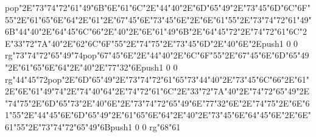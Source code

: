 pop{}\ipa\char"2E\ipa\char"73\ipa\char"74\ipa\char"72\ipa\char"61\ipa\char"49\ipa\char"6B\medskip\ipa\char"6E\ipa\char"61\ipa\char"6C\ipa\char"2E\ipa\char"44\ipa\char"40\ipa\char"2E\ipa\char"6D\ipa\char"65\ipa\char"49\ipa\char"2E\ipa\char"73\ipa\char"45\ipa\char"6D\medskip\vfill\eject\ipa\char"6C\ipa\char"6F\ipa\char"55\ipa\char"2E\ipa\char"61\ipa\char"65\ipa\char"6E\ipa\char"64\ipa\char"2E\ipa\char"61\ipa\char"2E\ipa\char"67\ipa\char"45\ipa\char"6E\medskip\ipa\char"73\ipa\char"45\ipa\char"6E\ipa\char"2E\ipa\char"6E\ipa\char"61\ipa\char"55\ipa\char"2E\ipa\char"73\ipa\char"74\ipa\char"72\ipa\char"61\ipa\char"49\ipa\char"6B\medskip\ipa\char"44\ipa\char"40\ipa\char"2E\ipa\char"64\ipa\char"45\ipa\char"6C\ipa\char"66\ipa\char"2E\ipa\char"40\ipa\char"2E\ipa\char"6E\ipa\char"61\ipa\char"49\ipa\char"6B\ipa\char"2E\ipa\char"64\ipa\char"45\ipa\char"72\ipa\char"2E\ipa\char"74\ipa\char"72\ipa\char"61\ipa\char"6C\ipa\char"2E\ipa\char"33\ipa\char"72\ipa\char"7A\medskip\ipa\char"40\ipa\char"2E\ipa\char"62\ipa\char"6C\ipa\char"6F\ipa\char"55\ipa\char"2E\ipa\char"74\ipa\char"75\ipa\char"2E\ipa\char"73\ipa\char"45\ipa\char"6D\ipa\char"2E\ipa\char"40\ipa\char"6E\ipa\char"2E\pdfcolorstack\match push{1 0 0 rg}\ipa\char"73\ipa\char"74\ipa\char"72\ipa\char"65\ipa\char"49\ipa\char"74\pdfcolorstack\match pop{}\medskip\ipa\char"67\ipa\char"45\ipa\char"6E\ipa\char"2E\ipa\char"44\ipa\char"40\ipa\char"2E\ipa\char"6C\ipa\char"6F\ipa\char"55\ipa\char"2E\ipa\char"67\ipa\char"45\ipa\char"6E\medskip\vfill\eject\ipa\char"6D\ipa\char"65\ipa\char"49\ipa\char"2E\ipa\char"61\ipa\char"65\ipa\char"6E\ipa\char"64\ipa\char"2E\ipa\char"40\ipa\char"2E\ipa\char"77\ipa\char"32\ipa\char"6E\medskip\pdfcolorstack\match push{1 0 0 rg}\ipa\char"44\ipa\char"45\ipa\char"72\pdfcolorstack\match pop{}\ipa\char"2E\ipa\char"6D\ipa\char"65\ipa\char"49\ipa\char"2E\ipa\char"73\ipa\char"74\ipa\char"72\ipa\char"61\ipa\char"65\ipa\char"73\medskip\ipa\char"44\ipa\char"40\ipa\char"2E\ipa\char"73\ipa\char"45\ipa\char"6C\ipa\char"66\ipa\char"2E\ipa\char"61\ipa\char"2E\ipa\char"6E\ipa\char"61\ipa\char"49\ipa\char"74\ipa\char"2E\ipa\char"74\ipa\char"40\ipa\char"64\ipa\char"2E\ipa\char"74\ipa\char"72\ipa\char"61\ipa\char"6C\ipa\char"2E\ipa\char"33\ipa\char"72\ipa\char"7A\medskip\ipa\char"40\ipa\char"2E\ipa\char"74\ipa\char"72\ipa\char"65\ipa\char"49\ipa\char"2E\ipa\char"74\ipa\char"75\ipa\char"2E\ipa\char"6D\ipa\char"65\ipa\char"73\ipa\char"2E\ipa\char"40\ipa\char"6E\ipa\char"2E\ipa\char"73\ipa\char"74\ipa\char"72\ipa\char"65\ipa\char"49\ipa\char"6E\medskip\ipa\char"77\ipa\char"32\ipa\char"6E\ipa\char"2E\ipa\char"74\ipa\char"75\ipa\char"2E\ipa\char"6E\ipa\char"61\ipa\char"55\ipa\char"2E\ipa\char"44\ipa\char"45\ipa\char"6E\medskip\vfill\eject\ipa\char"6D\ipa\char"65\ipa\char"49\ipa\char"2E\ipa\char"61\ipa\char"65\ipa\char"6E\ipa\char"64\ipa\char"2E\ipa\char"40\ipa\char"2E\ipa\char"73\ipa\char"45\ipa\char"6E\medskip\ipa\char"64\ipa\char"45\ipa\char"6E\ipa\char"2E\ipa\char"6E\ipa\char"61\ipa\char"55\ipa\char"2E\ipa\char"73\ipa\char"74\ipa\char"72\ipa\char"65\ipa\char"49\ipa\char"6B\medskip\pdfcolorstack\match push{1 0 0 rg}\ipa\char"68\ipa\char"61\pdfcolorstack\match 